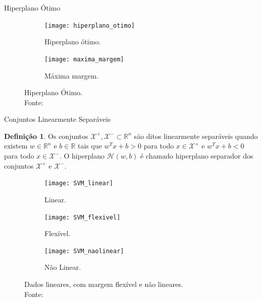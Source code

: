 \documentclass{beamer}
\def\Xset{\mathcal{X}}
\def\Hset{\mathcal{H}}
\def\RR{\mathds{R}}
\theoremstyle{definition}%
\newtheorem{defi}{Definição}
\begin{document}
\begin{frame}{Hiperplano Ótimo}
\begin{figure}[h] 
	\centering
	\begin{subfigure}[h]{0.4\textwidth}
		\centering
		\texttt{[image: hiperplano\_otimo]}
		\caption{Hiperplano ótimo. \label{fig3:a}}
	\end{subfigure}
	\begin{subfigure}[h]{0.4\textwidth}
		\centering
		\texttt{[image: maxima\_margem]}
		\caption{Máxima margem. \label{fig3:b}}	
	\end{subfigure}
	\caption{Hiperplano Ótimo. \label{fig3}
		\\ Fonte: \textcite{Evelin2017}}
\end{figure}
\end{frame}


\begin{frame}{Conjuntos Linearmente Separáveis}
\begin{defi} \label{def1} Os conjuntos $\Xset^{+}, \Xset^{-} \subset \RR^n$ são ditos linearmente separáveis quando existem $w\in \RR^n$ e $b\in \RR$  tais que $w^{T}x+b>0$ para todo $x\in \Xset^{+}$ e $w^{T}x+b<0$ para todo $x\in \Xset^{-}$. O hiperplano $\Hset(w,b)$ é chamado hiperplano separador dos conjuntos $\Xset^{+}$ e $\Xset^{-}$.
\end{defi}

\begin{figure}[!h] 
	\centering
	\begin{subfigure}[h]{0.25\textwidth}
		\centering
		\texttt{[image: SVM\_linear]}
		\caption{Linear. \label{fig1:a}}
	\end{subfigure}
	\begin{subfigure}[!h]{0.25\textwidth}
		\centering
		\texttt{[image: SVM\_flexivel]}
		\caption{Flexível. \label{fig1:b}}
	\end{subfigure}
	\begin{subfigure}[!h]{0.25\textwidth}
		\centering
		\texttt{[image: SVM\_naolinear]}
		\caption{Não Linear. \label{fig1:c}}
	\end{subfigure}
	\caption{Dados lineares, com margem flexível e não lineares. \label{fig1}\\ Fonte: \textcite{Evelin2017}}
\end{figure}
\end{frame}
\end{document}
